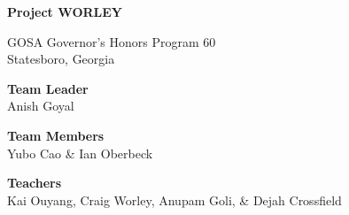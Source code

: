 \documentclass{article}
\renewcommand{\title}{Project WORLEY}
\begin{document}
\begin{titlepage}
  \centering
  \vspace*{1in}
  {\fontsize{56pt}{2\baselineskip}\selectfont \bfseries
  \title}
  \vfill

  \Large
  GOSA Governor's Honors Program 60\\
  Statesboro, Georgia

  \vspace{0.5in}
  \selectfont

  \vspace{1em}
  \textbf{Team Leader}\\ Anish Goyal

  \vspace{1em}
  \textbf{Team Members}\\ Yubo Cao \& Ian Oberbeck

  \vspace{1em}
  \textbf{Teachers}\\ Kai Ouyang, Craig Worley,  Anupam Goli, \& Dejah Crossfield
\end{titlepage}
\tableofcontents
\newpage
\end{document}

